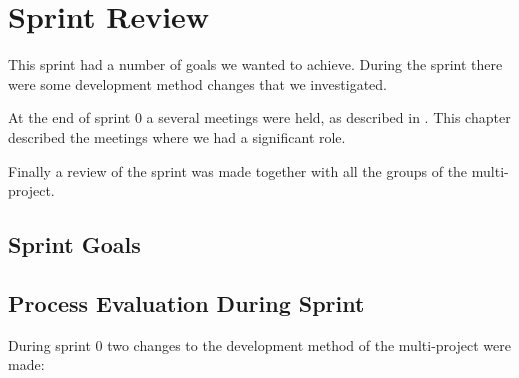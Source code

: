 \chapter{Sprint Review}\label{chap:sprint1_end}
This sprint had a number of goals we wanted to achieve. During the sprint there were some development method changes that we investigated.

At the end of sprint 0 a several meetings were held, as described in . This chapter described the meetings where we had a significant role.

Finally a review of the sprint was made together with all the groups of the multi-project.

\section{Sprint Goals}

\section{Process Evaluation During Sprint}
During sprint 0 two changes to the development method of the multi-project were made:

